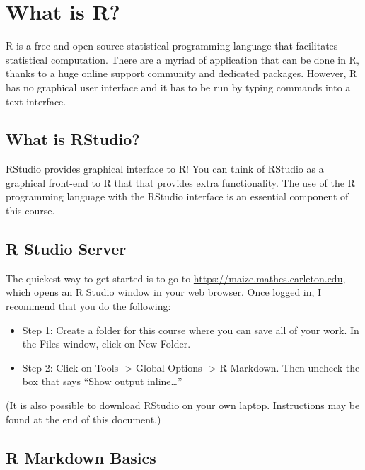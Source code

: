 \documentclass[
]{book}
\providecommand{\tightlist}{%
  \setlength{\itemsep}{0pt}\setlength{\parskip}{0pt}}
\begin{document}
\hypertarget{what-is-r}{%
\chapter{What is R?}\label{what-is-r}}

R is a free and open source statistical programming language that facilitates statistical computation. There are a myriad of application that can be done in R, thanks to a huge online support community and dedicated packages. However, R has no graphical user interface and it has to be run by typing commands into a text interface.

\hypertarget{what-is-rstudio}{%
\section{What is RStudio?}\label{what-is-rstudio}}

RStudio provides graphical interface to R! You can think of RStudio as a graphical front-end to R that that provides extra functionality. The use of the R programming language with the RStudio interface is an essential component of this course.

\hypertarget{r-studio-server}{%
\section{R Studio Server}\label{r-studio-server}}

The quickest way to get started is to go to \url{https://maize.mathcs.carleton.edu}, which opens an R Studio window in your web browser. Once logged in, I recommend that you do the following:

\begin{itemize}
\tightlist
\item
  Step 1: Create a folder for this course where you can save all of your work. In the Files window, click on New Folder.
\item
  Step 2: Click on Tools -\textgreater{} Global Options -\textgreater{} R Markdown. Then uncheck the box that says ``Show output inline\ldots{}''
\end{itemize}

(It is also possible to download RStudio on your own laptop. Instructions may be found at the end of this document.)

\hypertarget{r-markdown-basics}{%
\section{R Markdown Basics}\label{r-markdown-basics}}
\end{document}
